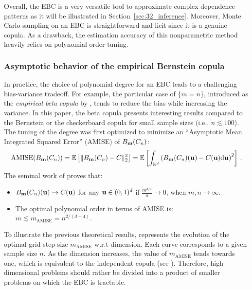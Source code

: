 Overall, the EBC is a very versatile tool to approximate complex dependence patterns as it will be illustrated in Section~\ref{sec:32_inference}. 
Moreover, Monte Carlo sampling on an EBC is straightforward and licit since it is a genuine copula. 
As a drawback, the estimation accuracy of this nonparametric method heavily relies on polynomial order tuning.   


\subsubsection{Asymptotic behavior of the empirical Bernstein copula}
In practice, the choice of polynomial degree for an EBC leads to a challenging bias-variance tradeoff. 
For example, the particular case of $\{m = n\}$, introduced as the \textit{empirical beta copula} by \cite{segers_2017}, tends to reduce the bias while increasing the variance. 
In this paper, the beta copula presents interesting results compared to the Bernstein or the checkerboard copula for small sample sizes (i.e., $n\lesssim100$). 
The tuning of the degree was first optimized to minimize an ``Asymptotic Mean Integrated Squared Error'' (AMISE) of $B_{{\bf m}}(C_n)$: 
\begin{equation}
    \mathrm{AMISE}(B_{{\bf m}}(C_n)) = \mathbb{E}\left[ \lVert B_{{\bf m}}(C_n) - C \rVert^2_2 \right] = \mathbb{E}\left[\int_{\mathbb{R}^d} \left(B_{{\bf m}}(C_n)({\bf u}) - C({\bf u}) \mathrm{d} {\bf u} \right)^2 \right]\, .
    \label{eq:aimse}
\end{equation}
The seminal work of \citet[Theorem 3]{sancetta_satchell_2004} proves that: 
\begin{itemize}
    \item $B_{{\bf m}}(C_n)({\bf u}) \rightarrow C({\bf u})$ for any ${\bf u} \in (0, 1)^d$ if $\frac{m^{d/2}}{n} \rightarrow 0$, when $m, n \rightarrow \infty$.
    \item The optimal polynomial order in terms of AMISE is\footnotemark: $m \lesssim m_{\mathrm{AMISE}} = n^{2/(d+4)}$.    
\end{itemize}
To illustrate the previous theoretical results,  represents the evolution of the optimal grid step size $m_{\mathrm{AMISE}}$ w.r.t dimension. 
Each curve corresponds to a given sample size $n$. 
As the dimension increases, the value of $m_{\mathrm{AMISE}}$ tends towards one, which is equivalent to the independent copula (see \citealp[p. 117]{lasserre_2022}). 
Therefore, high-dimensional problems should rather be divided into a product of smaller problems on which the EBC is tractable.

